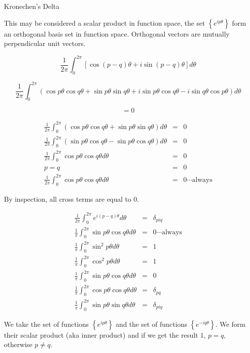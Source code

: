 \documentclass[a4paper,12pt]{article}
\begin{document}
Kronechen's Delta

This may be considered a scalar product in function space,
the set $\left\{ e^{ip\theta}\right\}$ form an orthogonal basis set 
in function space. Orthogonal vectors are mutually perpendicular unit 
vectors.

\[ \frac{1}{2 \pi} \int^{2 \pi}_{0} \left[ \cos{(p - q)\theta} + i\sin{(p
- q)\theta} \right] d \theta \]

\[ \frac{1}{2 \pi} \int^{2 \pi}_{0} \left( \cos{p \theta}\cos{q \theta}
+ \sin{p \theta}\sin{q \theta} + i \sin{p \theta}\cos{q \theta} - i
\sin{q \theta}\cos{p \theta} \right) d \theta \]

\[ = 0 \]


\begin{eqnarray*}
\frac{1}{2 \pi} \int^{2 \pi}_{0} \left( \cos{p \theta}\cos{q \theta} +
\sin{p \theta}\sin{q \theta} \right)d \theta & = & 0 \\
\frac{1}{2 \pi} \int^{2 \pi}_{0} \left( \sin{p \theta}\cos{q \theta} -
\sin{p \theta}\cos{q \theta} \right)d \theta & = & 0 \\
\frac{1}{2 \pi} \int^{2 \pi}_{0} \cos{p \theta}\cos{q \theta}d \theta & = & 0 \\
p = q & = & 0 \\
\frac{1}{2 \pi} \int^{2 \pi}_{0} \cos{p \theta}\cos{q \theta} d \theta &
= & 0 \cdots \mbox{always}
\end{eqnarray*}

By inspection, all cross terms are equal to $0$.

\begin{eqnarray*}
\frac{1}{2 \pi} \int^{2 \pi}_{0} e^{i(p - q)\theta} d \theta & = &
\delta_{piq} \\
\frac{1}{\pi} \int^{2 \pi}_{0} \sin{p \theta}\cos{q \theta}d \theta &
= & 0 \cdots \mbox{always} \\
\frac{1}{\pi} \int^{2 \pi}_{0} \sin^{2}{p \theta}d \theta & = & 1 \\
\frac{1}{\pi} \int^{2 \pi}_{0} \cos^{2}{p \theta}d \theta & = & 1 \\
\frac{1}{\pi} \int^{2 \pi}_{0} \sin{p \theta}\cos{q \theta}d \theta & = & 0 \\
\frac{1}{\pi} \int^{2 \pi}_{0} \cos{p \theta}\cos{q \theta}d \theta & = & \delta_{pq} \\
\frac{1}{\pi} \int^{2 \pi}_{0} \sin{p \theta}\sin{q \theta} d \theta & = & \delta_{piq}
\end{eqnarray*}

We take the set of functions $\left\{ e^{i p \theta} \right\}$
and the set of functions $\left\{ e^{-i q \theta} \right\}$. We form
their scalar product (aka inner product) and if we get the result $1$,
$p = q$, otherwise $p \neq q$.
\end{document}
